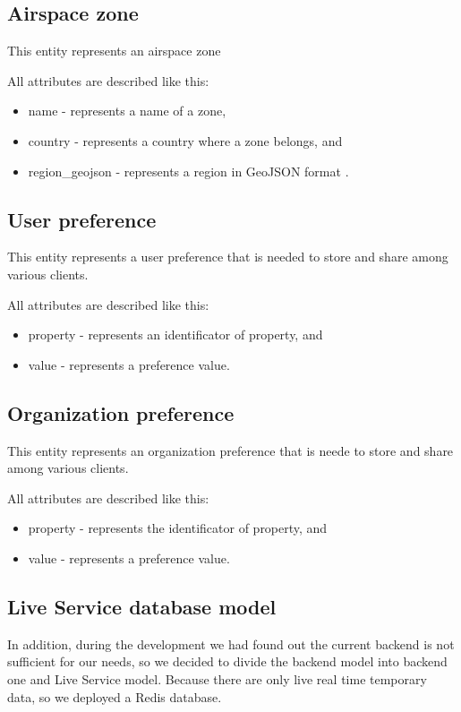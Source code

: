 \subsection{Airspace zone}\label{subsec:airspace-zone}
This entity represents an airspace zone

All attributes are described like this:
\begin{itemize}
    \item name - represents a name of a zone,
    \item country - represents a country where a zone belongs, and
    \item region\_geojson - represents a region in GeoJSON format \cite{geoJson}.
\end{itemize}

\subsection{User preference}\label{subsec:user-preference}
This entity represents a user preference that is needed to store and share among various clients.

All attributes are described like this:
\begin{itemize}
    \item property - represents an identificator of property, and
    \item value - represents a preference value.
\end{itemize}

\subsection{Organization preference}\label{subsec:organization-preference}
This entity represents an organization preference that is neede to store and share among various clients.

All attributes are described like this:
\begin{itemize}
    \item property - represents the identificator of property, and
    \item value - represents a preference value.
\end{itemize}

\subsection{Live Service database model}\label{subsec:live-service-database-model}
In addition, during the development we had found out the current backend is not sufficient for our needs, so we decided to divide the backend model into backend one and Live Service model.
Because there are only live real time temporary data, so we deployed a Redis database.

